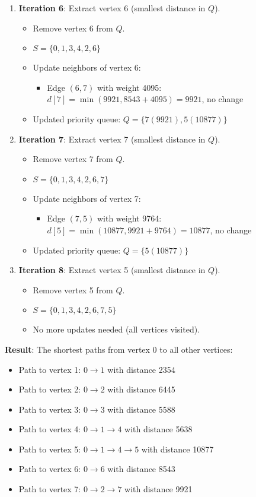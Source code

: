 \documentclass{article}
\theoremstyle{definition}
\begin{document}
\begin{enumerate}
\item \textbf{Iteration 6}: Extract vertex 6 (smallest distance in $Q$).
   \begin{itemize}
   \item Remove vertex 6 from $Q$.
   \item $S = \{0, 1, 3, 4, 2, 6\}$
   \item Update neighbors of vertex 6:
     \begin{itemize}
     \item Edge $(6,7)$ with weight 4095: $d[7] = \min(9921, 8543 + 4095) = 9921$, no change
     \end{itemize}
   \item Updated priority queue: $Q = \{7(9921), 5(10877)\}$
   \end{itemize}

\item \textbf{Iteration 7}: Extract vertex 7 (smallest distance in $Q$).
   \begin{itemize}
   \item Remove vertex 7 from $Q$.
   \item $S = \{0, 1, 3, 4, 2, 6, 7\}$
   \item Update neighbors of vertex 7:
     \begin{itemize}
     \item Edge $(7,5)$ with weight 9764: $d[5] = \min(10877, 9921 + 9764) = 10877$, no change
     \end{itemize}
   \item Updated priority queue: $Q = \{5(10877)\}$
   \end{itemize}

\item \textbf{Iteration 8}: Extract vertex 5 (smallest distance in $Q$).
   \begin{itemize}
   \item Remove vertex 5 from $Q$.
   \item $S = \{0, 1, 3, 4, 2, 6, 7, 5\}$
   \item No more updates needed (all vertices visited).
   \end{itemize}
\end{enumerate}

\noindent\textbf{Result}: The shortest paths from vertex 0 to all other vertices:
\begin{itemize}
\item Path to vertex 1: $0 \rightarrow 1$ with distance 2354
\item Path to vertex 2: $0 \rightarrow 2$ with distance 6445
\item Path to vertex 3: $0 \rightarrow 3$ with distance 5588
\item Path to vertex 4: $0 \rightarrow 1 \rightarrow 4$ with distance 5638
\item Path to vertex 5: $0 \rightarrow 1 \rightarrow 4 \rightarrow 5$ with distance 10877
\item Path to vertex 6: $0 \rightarrow 6$ with distance 8543
\item Path to vertex 7: $0 \rightarrow 2 \rightarrow 7$ with distance 9921
\end{itemize}
\end{document}
